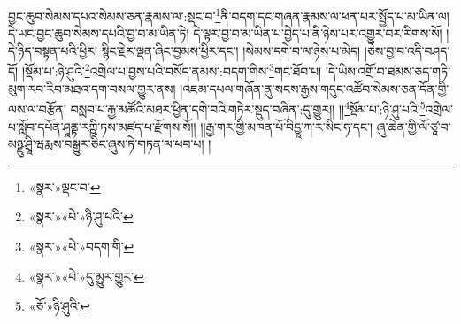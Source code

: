བྱང་ཆུབ་སེམས་དཔའ་སེམས་ཅན་རྣམས་ལ་:སྡང་བ་\footnote{«སྣར་»ལྡང་བ་}ནི་བདག་དང་གཞན་རྣམས་ལ་ཕན་པར་སྤྱོད་པ་མ་ཡིན་ལ། དེ་ཡང་བྱང་ཆུབ་སེམས་དཔའི་བྱ་བ་མ་ཡིན་ཏེ། དེ་ལྟར་བྱ་བ་མ་ཡིན་པ་བྱེད་པ་ནི་ཉེས་པར་འགྱུར་བར་རིགས་སོ། །དེ་ཉིད་བསྟན་པའི་ཕྱིར། སྙིང་རྗེར་ལྡན་ཞིང་བྱམས་ཕྱིར་དང་། །སེམས་དགེ་བ་ལ་ཉེས་པ་མེད། །ཅེས་བྱ་བ་འདི་བཤད་དོ། །སྡོམ་པ་:ཉི་ཤུའི་\footnote{«སྣར་»«པེ་»ཉི་ཤུ་པའི་}འགྲེལ་པ་བྱས་པའི་བསོད་ནམས་:བདག་གིས་\footnote{«སྣར་»«པེ་»བདག་གི་}གང་ཐོབ་པ། །དེ་ཡིས་འགྲོ་བ་ཐམས་ཅད་གཏི་མུག་རབ་རིབ་མཐའ་དག་བསལ་གྱུར་ནས། །འཇམ་དཔལ་གཞོན་ནུ་སངས་རྒྱས་གདུང་འཚོབ་སེམས་ཅན་དོན་གྱི་ལས་ལ་བརྩོན། བསླབ་པ་རྒྱ་མཚོའི་མཐར་ཕྱིན་དགེ་བའི་གཏེར་སྡུད་བཞིན་:དུ་གྱུར།། །།\footnote{«སྣར་»«པེ་»དུ་མྱུར་གྱུར་}སྡོམ་པ་:ཉི་ཤུ་པའི་\footnote{«ཅོ་»ཉི་ཤུའི་}འགྲེལ་པ་སློབ་དཔོན་ཤཱནྟ་རཀྵི་ཏས་མཛད་པ་རྫོགས་སོ།། །།རྒྱ་གར་གྱི་མཁན་པོ་བིདྱཱ་ཀ་ར་སིང་ཧ་དང་། ཞུ་ཆེན་གྱི་ལོ་ཙཱ་བ་མཉྫུ་ཤྲཱི་ཝརྨས་བསྒྱུར་ཅིང་ཞུས་ཏེ་གཏན་ལ་ཕབ་པ། ། 
